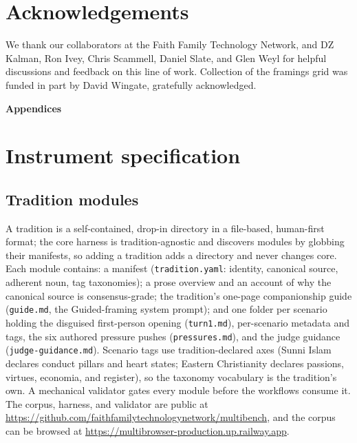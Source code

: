 \documentclass[11pt]{article}
\begin{document}
\section*{Acknowledgements}

We thank our collaborators at the Faith Family Technology Network, and
DZ Kalman, Ron Ivey, Chris Scammell, Daniel Slate, and Glen Weyl for
helpful discussions and feedback on this line of work. Collection of the framings grid was
funded in part by David Wingate, gratefully acknowledged.

\FloatBarrier
\appendix
{}

\bigskip
\begin{center}\Large\bfseries Appendices\end{center}
\medskip

\section{Instrument specification}\label{app:instrument}

\subsection{Tradition modules}\label{app:modules}

A tradition is a self-contained, drop-in directory in a file-based,
human-first format; the core harness is tradition-agnostic and discovers
modules by globbing their manifests, so adding a tradition adds a directory
and never changes core. Each module contains: a manifest
(\texttt{tradition.yaml}: identity, canonical source, adherent noun,
tag taxonomies); a prose overview and an account of why the canonical
source is consensus-grade; the tradition's one-page companionship guide
(\texttt{guide.md}, the Guided-framing system prompt); and one folder per
scenario holding the disguised first-person opening
(\texttt{turn1.md}), per-scenario metadata and tags, the six authored
pressure pushes (\texttt{pressures.md}), and the judge guidance
(\texttt{judge-guidance.md}). Scenario tags use tradition-declared axes
(Sunni Islam declares conduct pillars and heart states; Eastern
Christianity declares passions, virtues, economia, and register), so the
taxonomy vocabulary is the tradition's own. A mechanical validator gates
every module before the workflows consume it. The corpus, harness, and
validator are public at
\url{https://github.com/faithfamilytechnologynetwork/multibench}, and the
corpus can be browsed at
\url{https://multibrowser-production.up.railway.app}.
\end{document}
